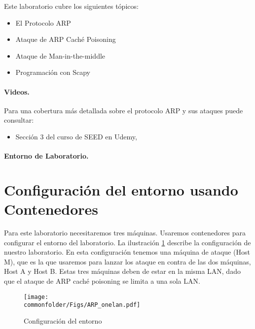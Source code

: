Este laboratorio cubre los siguientes tópicos:

\begin{itemize}[noitemsep]
\item El Protocolo ARP
\item Ataque de ARP Caché Poisoning
\item Ataque de Man-in-the-middle 
\item Programación con Scapy
\end{itemize}
 


\paragraph{Videos.}
Para una cobertura más detallada sobre el protocolo ARP y sus ataques puede consultar:

\begin{itemize}
\item Sección 3 del curso de SEED en Udemy, \seedisvideo
\end{itemize}


\paragraph{Entorno de Laboratorio.} \seedenvironmentC




\section{Configuración del entorno usando Contenedores}

Para este laboratorio necesitaremos tres máquinas. Usaremos contenedores para configurar el entorno del laboratorio. La ilustración \ref{arp:fig:labsetup} describe la configuración de nuestro laboratorio.
En esta configuración tenemos una máquina de ataque (Host M), que es la que usaremos para lanzar los ataque en contra de las dos máquinas, Host A y Host B. Estas tres máquinas deben de estar en la misma LAN, dado que el ataque de ARP caché poisoning se limita a una sola LAN.

\begin{figure}[htb]
\begin{center}
\texttt{[image: \\commonfolder/Figs/ARP\_onelan.pdf]}
\end{center}
\caption{Configuración del entorno}
\label{arp:fig:labsetup}
\end{figure}
 


